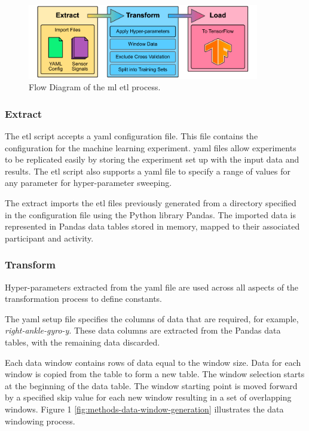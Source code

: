\begin{figure}[hbt]
    \centering
    \includegraphics[width=0.9\textwidth]{content/3-Methods/ML_ETL.pdf}
    \caption[Flow Diagram of the   process]{Flow Diagram of the \acrlong{ml} \acrshort{etl} process.}
    \label{fig:methods_ml_ETL}
\end{figure}

\subsubsection{Extract}
The \acrshort{etl} script accepts a \acrshort{yaml} configuration file. This file contains the configuration for the machine learning experiment. \acrshort{yaml} files allow experiments to be replicated easily by storing the experiment set up with the input data and results. The \acrshort{etl} script also supports a \acrshort{yaml} file to specify a range of values for any parameter for hyper-parameter sweeping.

The extract imports the \acrshort{etl} files previously generated from a directory specified in the configuration file using the Python library Pandas. The imported data is represented in Pandas data tables stored in memory, mapped to their associated participant and activity.
 
\subsubsection{Transform}
Hyper-parameters extracted from the \acrshort{yaml} file are used across all aspects of the transformation process to define constants.

The \acrshort{yaml} setup file specifies the columns of data that are required, for example, \textit{right-ankle-gyro-y}. These data columns are extracted from the Pandas data tables, with the remaining data discarded.

Each data window contains rows of data equal to the window size. Data for each window is copied from the table to form a new table. The window selection starts at the beginning of the data table. The window starting point is moved forward by a specified skip value for each new window resulting in a set of overlapping windows. Figure 1  \ref{fig:methods-data-window-generation} illustrates the data windowing process.


